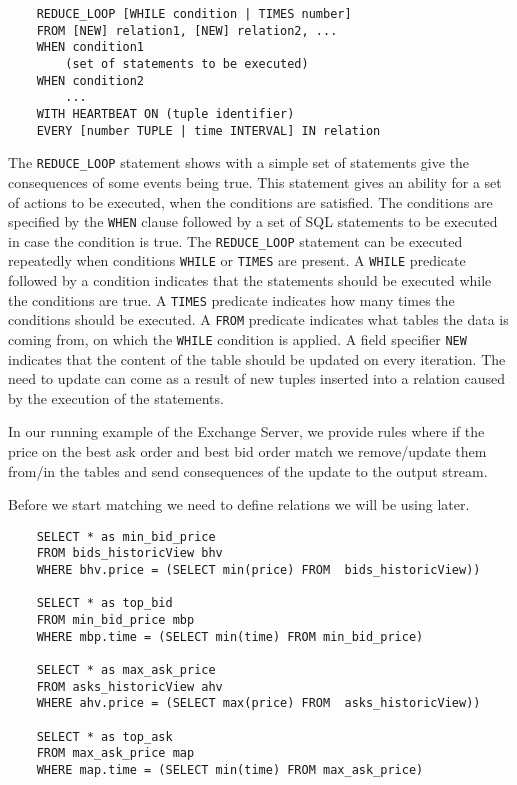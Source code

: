 \documentclass{article}
\begin{document}
\begin{verbatim}
    REDUCE_LOOP [WHILE condition | TIMES number]
    FROM [NEW] relation1, [NEW] relation2, ... 
    WHEN condition1
        (set of statements to be executed)
    WHEN condition2
        ...
    WITH HEARTBEAT ON (tuple identifier)
    EVERY [number TUPLE | time INTERVAL] IN relation 
\end{verbatim}

The {\tt REDUCE\_LOOP} statement shows with a simple set of statements give the consequences of some events being true. This statement gives an ability for a set of actions to be executed, when the conditions are satisfied. The conditions are specified by the {\tt WHEN} clause followed by a set of SQL statements to be executed in case the condition is true. The {\tt REDUCE\_LOOP} statement can be executed repeatedly when conditions {\tt WHILE} or {\tt TIMES} are present. A {\tt WHILE} predicate followed by a condition indicates that the statements should be executed while the conditions are true. A {\tt TIMES} predicate indicates how many times the conditions should be executed. A {\tt FROM} predicate indicates what tables the data is coming from, on which the {\tt WHILE} condition is applied. A field specifier {\tt NEW} indicates that the content of the table should be updated on every iteration. The need to update can come as a result of new tuples inserted into a relation caused by the execution of the statements.   

In our running example of the Exchange Server, we provide rules where if the price on the best ask order and best bid order match we remove/update them from/in the tables and send consequences of the update to the output stream.

Before we start matching we need to define relations we will be using later.

\begin{verbatim}      
    SELECT * as min_bid_price
    FROM bids_historicView bhv
    WHERE bhv.price = (SELECT min(price) FROM  bids_historicView))
    
    SELECT * as top_bid
    FROM min_bid_price mbp
    WHERE mbp.time = (SELECT min(time) FROM min_bid_price)
    
    SELECT * as max_ask_price
    FROM asks_historicView ahv
    WHERE ahv.price = (SELECT max(price) FROM  asks_historicView))
    
    SELECT * as top_ask
    FROM max_ask_price map
    WHERE map.time = (SELECT min(time) FROM max_ask_price)
\end{verbatim}
\end{document}

